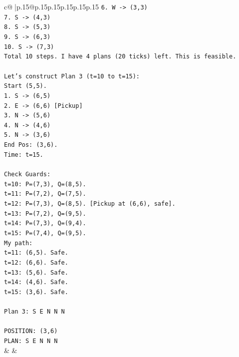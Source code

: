 \documentclass{article}
\begin{document}
{\begin{supertabular}{c@{$\;$}|p{.15\linewidth}@{}p{.15\linewidth}p{.15\linewidth}p{.15\linewidth}p{.15\linewidth}p{.15\linewidth}}
{{{\texttt{6. W {-}> (3,3)} \\
\texttt{7. S {-}> (4,3)} \\
\texttt{8. S {-}> (5,3)} \\
\texttt{9. S {-}> (6,3)} \\
\texttt{10. S {-}> (7,3)} \\
\texttt{Total 10 steps. I have 4 plans (20 ticks) left. This is feasible.} \\
\\ 
\texttt{Let's construct Plan 3 (t=10 to t=15):} \\
\texttt{Start (5,5).} \\
\texttt{1. S {-}> (6,5)} \\
\texttt{2. E {-}> (6,6) {[}Pickup{]}} \\
\texttt{3. N {-}> (5,6)} \\
\texttt{4. N {-}> (4,6)} \\
\texttt{5. N {-}> (3,6)} \\
\texttt{End Pos: (3,6).} \\
\texttt{Time: t=15.} \\
\\ 
\texttt{Check Guards:} \\
\texttt{t=10: P=(7,3), Q=(8,5).} \\
\texttt{t=11: P=(7,2), Q=(7,5).} \\
\texttt{t=12: P=(7,3), Q=(8,5). {[}Pickup at (6,6), safe{]}.} \\
\texttt{t=13: P=(7,2), Q=(9,5).} \\
\texttt{t=14: P=(7,3), Q=(9,4).} \\
\texttt{t=15: P=(7,4), Q=(9,5).} \\
\texttt{My path:} \\
\texttt{t=11: (6,5). Safe.} \\
\texttt{t=12: (6,6). Safe.} \\
\texttt{t=13: (5,6). Safe.} \\
\texttt{t=14: (4,6). Safe.} \\
\texttt{t=15: (3,6). Safe.} \\
\\ 
\texttt{Plan 3: S E N N N} \\
\\ 
\texttt{POSITION: (3,6)} \\
\texttt{PLAN: S E N N N} \\
            }
        }
    }
    & & \\ \\


\end{supertabular}}
\end{document}
